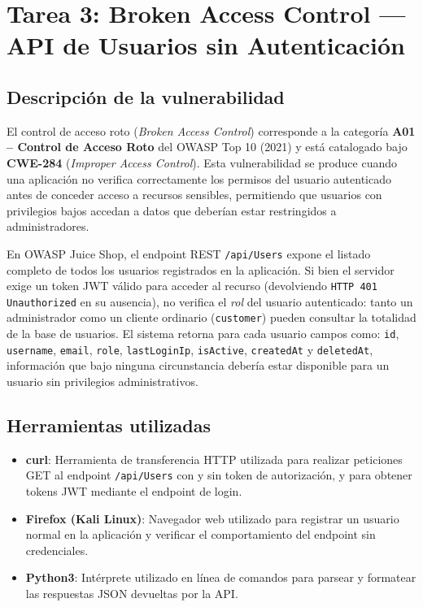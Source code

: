 \documentclass[12pt, letterpaper]{article}
\begin{document}
\section{Tarea 3: Broken Access Control --- API de Usuarios sin Autenticación}

\subsection{Descripción de la vulnerabilidad}

El control de acceso roto (\textit{Broken Access Control}) corresponde a la categoría \textbf{A01 -- Control de Acceso Roto} del OWASP Top 10 (2021) y está catalogado bajo \textbf{CWE-284} (\textit{Improper Access Control}). Esta vulnerabilidad se produce cuando una aplicación no verifica correctamente los permisos del usuario autenticado antes de conceder acceso a recursos sensibles, permitiendo que usuarios con privilegios bajos accedan a datos que deberían estar restringidos a administradores.

En OWASP Juice Shop, el endpoint REST \texttt{/api/Users} expone el listado completo de todos los usuarios registrados en la aplicación. Si bien el servidor exige un token JWT válido para acceder al recurso (devolviendo \texttt{HTTP 401 Unauthorized} en su ausencia), no verifica el \textit{rol} del usuario autenticado: tanto un administrador como un cliente ordinario (\texttt{customer}) pueden consultar la totalidad de la base de usuarios. El sistema retorna para cada usuario campos como: \texttt{id}, \texttt{username}, \texttt{email}, \texttt{role}, \texttt{lastLoginIp}, \texttt{isActive}, \texttt{createdAt} y \texttt{deletedAt}, información que bajo ninguna circunstancia debería estar disponible para un usuario sin privilegios administrativos.

\subsection{Herramientas utilizadas}

\begin{itemize}
  \item \textbf{curl}: Herramienta de transferencia HTTP utilizada para realizar peticiones GET al endpoint \texttt{/api/Users} con y sin token de autorización, y para obtener tokens JWT mediante el endpoint de login.
  \item \textbf{Firefox (Kali Linux)}: Navegador web utilizado para registrar un usuario normal en la aplicación y verificar el comportamiento del endpoint sin credenciales.
  \item \textbf{Python3}: Intérprete utilizado en línea de comandos para parsear y formatear las respuestas JSON devueltas por la API.
\end{itemize}
\end{document}
